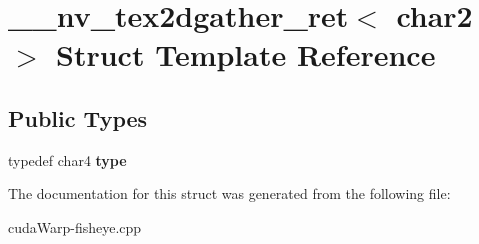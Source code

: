 \hypertarget{struct____nv__tex2dgather__ret_3_01char2_01_4}{}\section{\+\_\+\+\_\+nv\+\_\+tex2dgather\+\_\+ret$<$ char2 $>$ Struct Template Reference}
\label{struct____nv__tex2dgather__ret_3_01char2_01_4}
\subsection*{Public Types}
\begin{DoxyCompactItemize}
\item 
typedef char4 {\bfseries type}\hypertarget{struct____nv__tex2dgather__ret_3_01char2_01_4_a4056289d9709d1ebafae071dcd87a126}{}\label{struct____nv__tex2dgather__ret_3_01char2_01_4_a4056289d9709d1ebafae071dcd87a126}

\end{DoxyCompactItemize}


The documentation for this struct was generated from the following file\+:\begin{DoxyCompactItemize}
\item 
cuda\+Warp-\/fisheye.\+cpp\end{DoxyCompactItemize}

